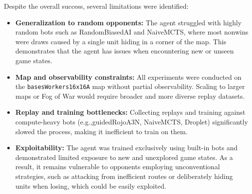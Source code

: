 \documentclass[10pt,twocolumn,letterpaper]{article}
\begin{document}
Despite the overall success, several limitations were identified:  
\begin{itemize}
    \item \textbf{Generalization to random opponents:} The agent struggled with highly random bots such as RandomBiasedAI and NaiveMCTS, where most nonwins were draws caused by a single unit hiding in a corner of the map. This demonstrates that the agent has issues when encountering new or unseen game states.
    \item \textbf{Map and observability constraints:} All experiments were conducted on the \texttt{basesWorkers16x16A} map without partial observability. Scaling to larger maps or Fog of War would require broader and more diverse replay datasets.
    \item \textbf{Replay and training bottlenecks:} Collecting replays and training against compute-heavy bots (e.g.,guidedRojoA3N, NaiveMCTS, Droplet) significantly slowed the process, making it inefficient to train on them.
    \item \textbf{Exploitability:} The agent was trained exclusively using built-in bots and demonstrated limited exposure to new and unexplored game states. As a result, it remains vulnerable to opponents employing unconventional strategies, such as attacking from inefficient routes or deliberately hiding units when losing, which could be easily exploited.
\end{itemize}
\end{document}
